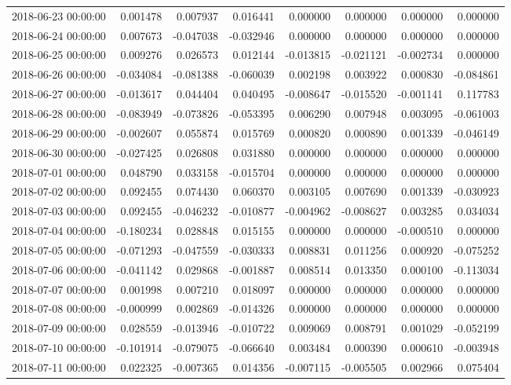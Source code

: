 \begin{tabular}{lrrrrrrr}
2018-06-23 00:00:00 & 0.001478 & 0.007937 & 0.016441 & 0.000000 & 0.000000 & 0.000000 & 0.000000 \\
2018-06-24 00:00:00 & 0.007673 & -0.047038 & -0.032946 & 0.000000 & 0.000000 & 0.000000 & 0.000000 \\
2018-06-25 00:00:00 & 0.009276 & 0.026573 & 0.012144 & -0.013815 & -0.021121 & -0.002734 & 0.000000 \\
2018-06-26 00:00:00 & -0.034084 & -0.081388 & -0.060039 & 0.002198 & 0.003922 & 0.000830 & -0.084861 \\
2018-06-27 00:00:00 & -0.013617 & 0.044404 & 0.040495 & -0.008647 & -0.015520 & -0.001141 & 0.117783 \\
2018-06-28 00:00:00 & -0.083949 & -0.073826 & -0.053395 & 0.006290 & 0.007948 & 0.003095 & -0.061003 \\
2018-06-29 00:00:00 & -0.002607 & 0.055874 & 0.015769 & 0.000820 & 0.000890 & 0.001339 & -0.046149 \\
2018-06-30 00:00:00 & -0.027425 & 0.026808 & 0.031880 & 0.000000 & 0.000000 & 0.000000 & 0.000000 \\
2018-07-01 00:00:00 & 0.048790 & 0.033158 & -0.015704 & 0.000000 & 0.000000 & 0.000000 & 0.000000 \\
2018-07-02 00:00:00 & 0.092455 & 0.074430 & 0.060370 & 0.003105 & 0.007690 & 0.001339 & -0.030923 \\
2018-07-03 00:00:00 & 0.092455 & -0.046232 & -0.010877 & -0.004962 & -0.008627 & 0.003285 & 0.034034 \\
2018-07-04 00:00:00 & -0.180234 & 0.028848 & 0.015155 & 0.000000 & 0.000000 & -0.000510 & 0.000000 \\
2018-07-05 00:00:00 & -0.071293 & -0.047559 & -0.030333 & 0.008831 & 0.011256 & 0.000920 & -0.075252 \\
2018-07-06 00:00:00 & -0.041142 & 0.029868 & -0.001887 & 0.008514 & 0.013350 & 0.000100 & -0.113034 \\
2018-07-07 00:00:00 & 0.001998 & 0.007210 & 0.018097 & 0.000000 & 0.000000 & 0.000000 & 0.000000 \\
2018-07-08 00:00:00 & -0.000999 & 0.002869 & -0.014326 & 0.000000 & 0.000000 & 0.000000 & 0.000000 \\
2018-07-09 00:00:00 & 0.028559 & -0.013946 & -0.010722 & 0.009069 & 0.008791 & 0.001029 & -0.052199 \\
2018-07-10 00:00:00 & -0.101914 & -0.079075 & -0.066640 & 0.003484 & 0.000390 & 0.000610 & -0.003948 \\
2018-07-11 00:00:00 & 0.022325 & -0.007365 & 0.014356 & -0.007115 & -0.005505 & 0.002966 & 0.075404 \\

\end{tabular}
